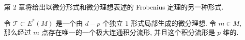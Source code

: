 \begin{remark}
第 2 章将给出以微分形式和微分理想表述的 Frobenius 定理的另一种形式. 
\end{remark}

\begin{thm}[Frobenius定理用微分形式与微分理想表示的形式]
    令 $\mathscr{T} \subset E^*(M)$ 是一个由 $d-p$ 个独立 $1$ 形式局部生成的微分理想. 令 $m \in M$, 那么经过 $m$ 点存在唯一的一个极大连通积分流形, 并且这个积分流形是 $p$ 维的.
\end{thm}















































































































